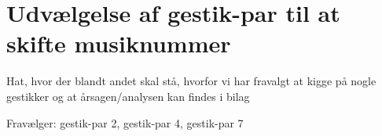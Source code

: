 \section{Udvælgelse af gestik-par til at skifte musiknummer}
\label{TestresultaterSkiftMusiknummer}
%
Hat, hvor der blandt andet skal stå, hvorfor vi har fravalgt at kigge på nogle gestikker og at årsagen/analysen kan findes i bilag 


Fravælger: gestik-par 2, gestik-par 4, gestik-par 7